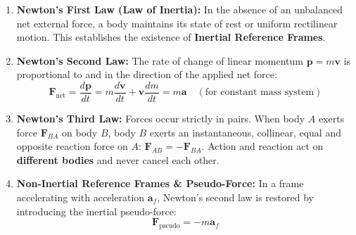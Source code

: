 \documentclass[10pt,a4paper]{article}
\begin{document}
\begin{conceptbox}
\begin{enumerate}[leftmargin=*]
  \item \textbf{Newton's First Law (Law of Inertia):} In the absence of an unbalanced net external force, a body maintains its state of rest or uniform rectilinear motion. This establishes the existence of \textbf{Inertial Reference Frames}.
  \item \textbf{Newton's Second Law:} The rate of change of linear momentum $\mathbf{p} = m\mathbf{v}$ is proportional to and in the direction of the applied net force:
  \begin{equation}
    \mathbf{F}_{\text{net}} = \frac{d\mathbf{p}}{dt} = m\frac{d\mathbf{v}}{dt} + \mathbf{v}\frac{dm}{dt} = m\mathbf{a} \quad (\text{for constant mass system})
  \end{equation}
  \item \textbf{Newton's Third Law:} Forces occur strictly in pairs. When body $A$ exerts force $\mathbf{F}_{BA}$ on body $B$, body $B$ exerts an instantaneous, collinear, equal and opposite reaction force on $A$: $\mathbf{F}_{AB} = -\mathbf{F}_{BA}$. Action and reaction act on \textbf{different bodies} and never cancel each other.
  \item \textbf{Non-Inertial Reference Frames \& Pseudo-Force:} In a frame accelerating with acceleration $\mathbf{a}_f$, Newton's second law is restored by introducing the inertial pseudo-force:
  \begin{equation}
    \mathbf{F}_{\text{pseudo}} = -m\mathbf{a}_f
  \end{equation}
\end{enumerate}
\end{conceptbox}
\end{document}
